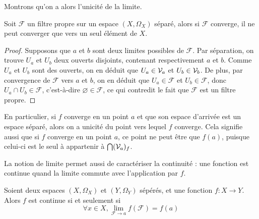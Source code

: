 Montrons qu'on a alors l'unicité de la limite.

\begin{proposition}
  Soit $\mathcal F$ un filtre propre sur un espace $(X,\Omega_X)$ séparé, alors
  si $\mathcal F$ converge, il ne peut converger que vers un seul élément de
  $X$.
\end{proposition}

\begin{proof}
  Supposons que $a$ et $b$ sont deux limites possibles de $\mathcal F$. Par
  séparation, on trouve $U_a$ et $U_b$ deux ouverts disjoints, contenant
  respectivement $a$ et $b$. Comme $U_a$ et $U_b$ sont des ouverts, on en déduit
  que $U_a\in\mathcal{V}_a$ et $U_b\in\mathcal{V}_b$. De plus, par convergence de
  $\mathcal F$ vers $a$ et $b$, on en déduit que $U_a\in\mathcal F$ et
  $U_b\in\mathcal F$, donc $U_a\cap U_b\in\mathcal F$, c'est-à-dire
  $\varnothing\in\mathcal F$, ce qui contredit le fait que $\mathcal F$ est
  un filtre propre.
\end{proof}

En particulier, si $f$ converge en un point $a$ et que son espace d'arrivée est
un espace séparé, alors on a unicité du point vers lequel $f$ converge. Cela
signifie aussi que si $f$ converge en un point $a$, ce point ne peut être que
$f(a)$, puisque celui-ci est le seul à appartenir à $\bigcap (\mathcal{V}_a)_f$.

La notion de limite permet aussi de caractériser la continuité : une fonction
est continue quand la limite commute avec l'application par $f$.

\begin{property}
  Soient deux espaces $(X,\Omega_X)$ et $(Y,\Omega_Y)$ sépérés, et une fonction
  $f : X \to Y$. Alors $f$ est continue si et seulement si
  \[\forall x \in X, \lim_{\mathcal F \to a} f(\mathcal F) = f(a)\]
\end{property}

